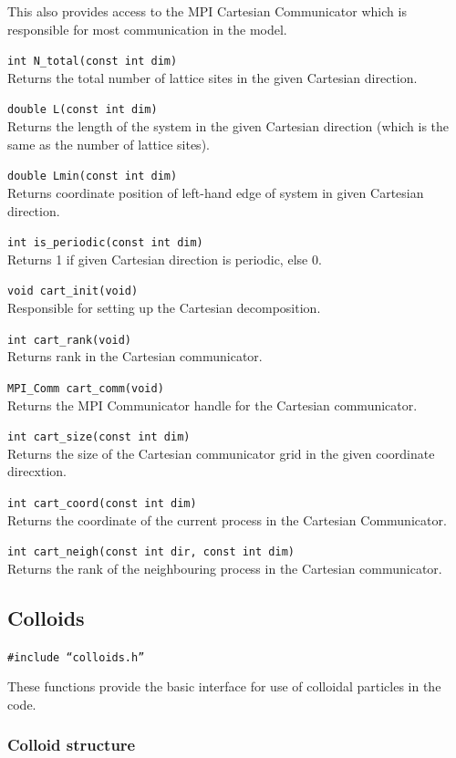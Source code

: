 This also provides access to the MPI Cartesian Communicator which
is responsible for most communication in the model.

\texttt{int N\_total(const int dim)}\\
Returns the total number of lattice sites in the given Cartesian direction.

\texttt{double L(const int dim)}\\
Returns the length of the system in the given Cartesian direction
(which is the same as the number of lattice sites).

\texttt{double Lmin(const int dim)}\\
Returns coordinate position of left-hand edge of system in given
Cartesian direction.

\texttt{int is\_periodic(const int dim)}\\
Returns 1 if given Cartesian direction is periodic, else 0.

\texttt{void cart\_init(void)}\\
Responsible for setting up the Cartesian decomposition.

\texttt{int cart\_rank(void)}\\
Returns rank in the Cartesian communicator.

\texttt{MPI\_Comm cart\_comm(void)}\\
Returns the MPI Communicator handle for the Cartesian communicator.

\texttt{int cart\_size(const int dim)}\\
Returns the size of the Cartesian communicator grid in the given
coordinate direcxtion.

\texttt{int cart\_coord(const int dim)}\\
Returns the coordinate of the current process in the Cartesian
Communicator.

\texttt{int cart\_neigh(const int dir, const int dim)}\\
Returns the rank of the neighbouring process in the
Cartesian communicator.


\subsection{Colloids}

\texttt{\#include ``colloids.h''}

These functions provide the basic interface for use
of colloidal particles in the code.

\subsubsection{Colloid structure}

